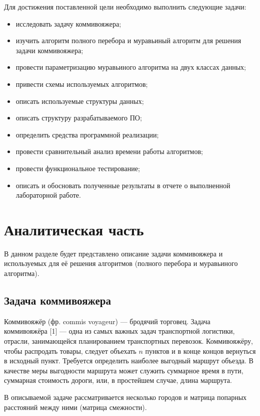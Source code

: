 \documentclass[a4paper,14pt, unknownkeysallowed]{extreport}
\begin{document}
Для достижения поставленной цели необходимо выполнить следующие задачи:

\begin{itemize}
	\item исследовать задачу коммивояжера;
	\item изучить алгоритм полного перебора и муравьиный алгоритм для решения задачи коммивояжера;
	\item провести параметризацию муравьиного алгоритма на двух классах данных;
	\item привести схемы используемых алгоритмов;
	\item описать используемые структуры данных;
	\item описать структуру разрабатываемого ПО;
	\item определить средства программной реализации;
	\item провести сравнительный анализ времени работы алгоритмов;
	\item провести функциональное тестирование;
	\item описать и обосновать полученные результаты в отчете о выполненной лабораторной работе.
\end{itemize}





\chapter{Аналитическая часть}

В данном разделе будет представлено описание задачи коммивояжера и используемых для её решения алгоритмов (полного перебора и муравьиного алгоритма).

\section{Задача коммивояжера}


Коммивояжёр (фр. commis voyageur) — бродячий торговец. Задача коммивояжёра [1] — одна из самых важных задач транспортной логистики, отрасли, занимающейся планированием транспортных перевозок. Коммивояжёру, чтобы распродать товары, следует объехать $n$ пунктов и в конце концов вернуться в исходный пункт. Требуется определить наиболее выгодный маршрут объезда. В качестве меры выгодности маршрута может служить суммарное время в пути, суммарная стоимость дороги, или, в простейшем случае, длина маршрута.

 В описываемой задаче рассматривается несколько городов и матрица попарных расстояний между ними (матрица смежности).
\end{document}
